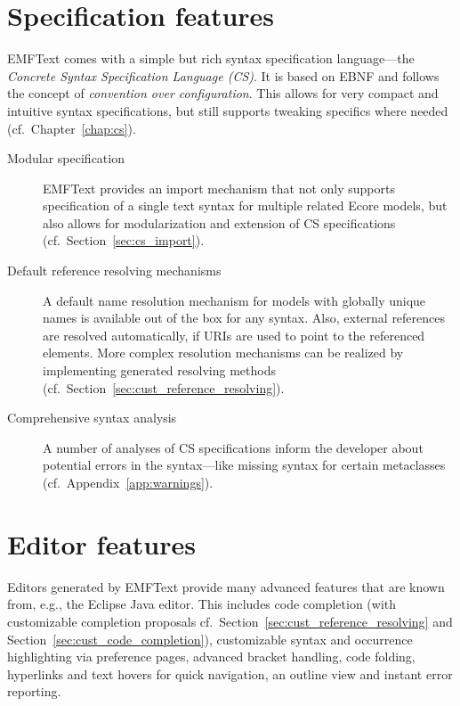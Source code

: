 \section{Specification features}

EMFText comes with a simple but rich syntax specification language---the
\emph{Concrete Syntax Specification Language (CS)}. It is based on EBNF 
and follows the concept of \emph{convention over configuration}. This 
allows for very compact and intuitive syntax specifications, but still 
supports tweaking specifics where needed (cf.~Chapter~\ref{chap:cs}).

\begin{description}

  \item[Modular specification]
        EMFText provides an import mechanism that not only supports specification 
        of a single text syntax for multiple related Ecore models, but also allows 
        for modularization and extension of CS specifications (cf.~Section~\ref{sec:cs_import}).

  \item[Default reference resolving mechanisms]
        A default name resolution mechanism for models with globally unique 
        names is available out of the box for any syntax. Also, external
        references are resolved automatically, if URIs are used to point to the
        referenced elements. More complex resolution mechanisms can be realized
        by implementing generated resolving methods 
        (cf.~Section~\ref{sec:cust_reference_resolving}).

  \item[Comprehensive syntax analysis]
        A number of analyses of CS specifications inform the developer about 
        potential errors in the syntax---like missing syntax for certain 
        metaclasses (cf.~Appendix~\ref{app:warnings}).

\end{description}


\section{Editor features}

Editors generated by EMFText provide many advanced features that are known from,
e.g., the Eclipse Java editor. This includes code completion (with customizable 
completion proposals cf.~Section~\ref{sec:cust_reference_resolving} 
and Section~\ref{sec:cust_code_completion}), customizable syntax and occurrence 
highlighting via preference pages, advanced bracket handling, code folding, 
hyperlinks and text hovers for quick navigation, an outline view and instant error reporting.



